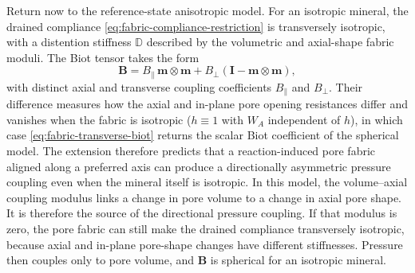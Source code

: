 Return now to the reference-state anisotropic model. For an isotropic mineral,
the drained compliance \eqref{eq:fabric-compliance-restriction} is transversely isotropic,
with a distention stiffness \(\mathbb D\) described by the volumetric and
axial-shape fabric moduli. The Biot tensor takes the form
\begin{equation}
 \mathbf B=B_\parallel\,\mathbf m\otimes\mathbf m
   +B_\perp(\mathbf I-\mathbf m\otimes\mathbf m),
 \label{eq:fabric-transverse-biot}
\end{equation}
with distinct axial and transverse coupling coefficients \(B_\parallel\)
and \(B_\perp\). Their difference measures how the axial and in-plane pore
opening resistances differ and vanishes when the fabric is isotropic
(\(h\equiv1\) with \(W_A\) independent of \(h\)), in which case
\eqref{eq:fabric-transverse-biot} returns the scalar Biot coefficient of
the spherical model. The extension therefore predicts that a
reaction-induced pore fabric aligned along a preferred axis can produce a
directionally asymmetric pressure coupling even when the mineral itself is
isotropic. In this model, the volume--axial coupling modulus links a change
in pore volume to a change in axial pore shape. It is therefore the source
of the directional pressure coupling. If that modulus is zero, the pore
fabric can still make the drained compliance transversely isotropic, because
axial and in-plane pore-shape changes have different stiffnesses. Pressure
then couples only to pore volume, and \(\mathbf B\) is spherical for an
isotropic mineral.
